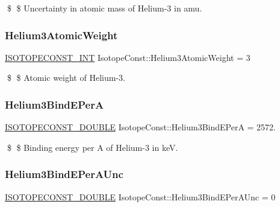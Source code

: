 \$ \$ Uncertainty in atomic mass of Helium-\/3 in amu. \mbox{\label{group___isotope_const-_helium-_he3_ga6fee768b3c02d4130bdcfcd8a1d7ab0f}} 
\subsubsection{\texorpdfstring{Helium3\+Atomic\+Weight}{Helium3AtomicWeight}}
{\footnotesize\ttfamily \mbox{\hyperlink{group___isotope_const-_macros_ga5f18360b3e99483a35c32d789e62621c}{I\+S\+O\+T\+O\+P\+E\+C\+O\+N\+S\+T\+\_\+\+I\+NT}} Isotope\+Const\+::\+Helium3\+Atomic\+Weight = 3}

\$ \$ Atomic weight of Helium-\/3. \mbox{\label{group___isotope_const-_helium-_he3_gafa47248d217aecaeb2cb0e0bd93c7365}} 
\subsubsection{\texorpdfstring{Helium3\+Bind\+E\+PerA}{Helium3BindEPerA}}
{\footnotesize\ttfamily \mbox{\hyperlink{group___isotope_const-_macros_ga8f45a7272ce02c0b4c65c44636ed719a}{I\+S\+O\+T\+O\+P\+E\+C\+O\+N\+S\+T\+\_\+\+D\+O\+U\+B\+LE}} Isotope\+Const\+::\+Helium3\+Bind\+E\+PerA = 2572.}

\$ \$ Binding energy per A of Helium-\/3 in keV. \mbox{\label{group___isotope_const-_helium-_he3_gaf63a348fe6bcdd249e127df64497c034}} 
\subsubsection{\texorpdfstring{Helium3\+Bind\+E\+Per\+A\+Unc}{Helium3BindEPerAUnc}}
{\footnotesize\ttfamily \mbox{\hyperlink{group___isotope_const-_macros_ga8f45a7272ce02c0b4c65c44636ed719a}{I\+S\+O\+T\+O\+P\+E\+C\+O\+N\+S\+T\+\_\+\+D\+O\+U\+B\+LE}} Isotope\+Const\+::\+Helium3\+Bind\+E\+Per\+A\+Unc = 0}

